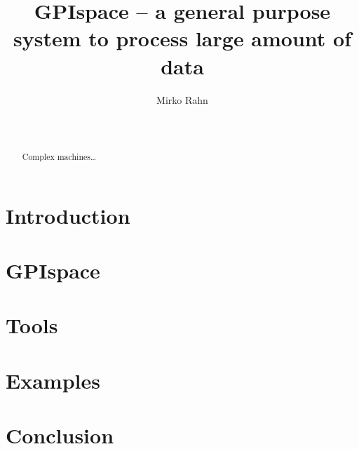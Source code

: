 \documentclass{acm_proc_article-sp}
\begin{document}
\title{GPIspace -- a general purpose system to process large amount of
data}


\author{
\alignauthor
 Mirko Rahn
 \\
 \\
 \\
}

\maketitle

\begin{abstract}
Complex machines\ldots
\end{abstract}

\section{Introduction}
\section{GPIspace}
\section{Tools}
\section{Examples}
\section{Conclusion}
\end{document}
